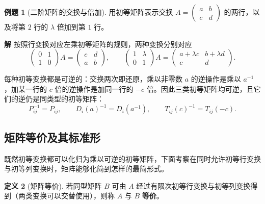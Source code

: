 \documentclass[UTF8, fontset=fandol, a4paper, 12pt]{ctexart}
\theoremstyle{definition}
\newtheorem{definition}{定义}[section]
\newtheorem{example}[definition]{例题}
\begin{document}
\begin{example}[二阶矩阵的交换与倍加]
用初等矩阵表示交换 $A=\begin{pmatrix}a&b\\c&d\end{pmatrix}$ 的两行，以及将第 $2$ 行的 $\lambda$ 倍加到第 $1$ 行。
\end{example}
\noindent\textbf{解}\quad
按照行变换对应左乘初等矩阵的规则，两种变换分别对应
\[
 \begin{pmatrix}0&1\\1&0\end{pmatrix}A
 =\begin{pmatrix}c&d\\a&b\end{pmatrix},
 \qquad
 \begin{pmatrix}1&\lambda\\0&1\end{pmatrix}A
 =\begin{pmatrix}a+\lambda c&b+\lambda d\\c&d\end{pmatrix}.
\]

每种初等变换都是可逆的：交换两次即还原，乘以非零数 $a$ 的逆操作是乘以 $a^{-1}$，加某一行的 $c$ 倍的逆操作是加同一行的 $-c$ 倍。因此三类初等矩阵均可逆，且它们的逆仍是同类型的初等矩阵：
\[
 P_{ij}^{-1}=P_{ij},\qquad D_i(a)^{-1}=D_i(a^{-1}),\qquad
 T_{ij}(c)^{-1}=T_{ij}(-c).
\]

\subsection{矩阵等价及其标准形}

既然初等变换都可以化归为乘以可逆的初等矩阵，下面考察在同时允许初等行变换与初等列变换时，矩阵能够化简到怎样的最简形式。

\begin{definition}[矩阵等价]
若同型矩阵 $B$ 可由 $A$ 经过有限次初等行变换与初等列变换得到（两类变换可以交替使用），则称 $A$ 与 $B$ \textbf{等价}。
\end{definition}
\end{document}
